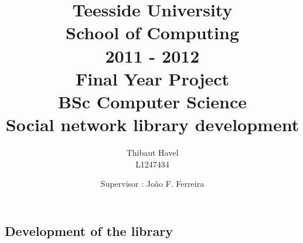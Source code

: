 \documentclass[12pt,a4paper,utf8x]{report}
\title
{
	\normalsize
	{
		Teesside University\\
		School of Computing\\
		2011 - 2012\\
	}
	\vspace{45mm}
	\textbf{Final Year Project}\\
	\normalsize{BSc Computer Science}\\
	\vspace{10mm}
	\huge{Social network library development}\\
}
\author
{
	Thibaut Havel\\
	\normalsize{L1247434}\\
	\vspace{45mm}
}
\date
{
	\normalsize
	{
		Supervisor : Jo\~{a}o F. Ferreira
	}
}
\begin{document}
\maketitle
\begin{onehalfspace}


\tableofcontents
\part{Development of the library}










\nocite{*}
\end{onehalfspace}
\printindex
\end{document}
